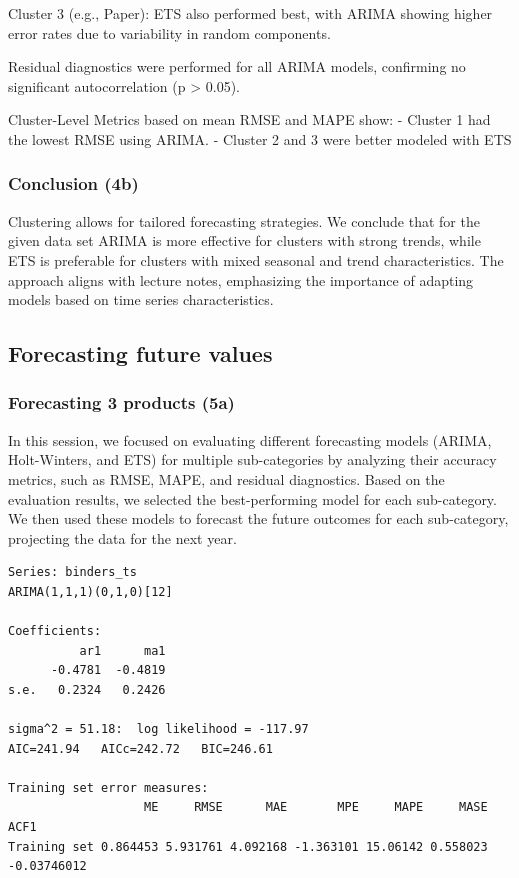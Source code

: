 \documentclass[
  letterpaper,
  DIV=11,
  numbers=noendperiod]{scrartcl}
\begin{document}
Cluster 3 (e.g., Paper): ETS also performed best, with ARIMA showing
higher error rates due to variability in random components.

Residual diagnostics were performed for all ARIMA models, confirming no
significant autocorrelation (p \textgreater{} 0.05).

Cluster-Level Metrics based on mean RMSE and MAPE show: - Cluster 1 had
the lowest RMSE using ARIMA. - Cluster 2 and 3 were better modeled with
ETS

\subsubsection{Conclusion (4b)}\label{conclusion-4b}

Clustering allows for tailored forecasting strategies. We conclude that
for the given data set ARIMA is more effective for clusters with strong
trends, while ETS is preferable for clusters with mixed seasonal and
trend characteristics. The approach aligns with lecture notes,
emphasizing the importance of adapting models based on time series
characteristics.

\subsection{Forecasting future values}\label{forecasting-future-values}

\subsubsection{Forecasting 3 products
(5a)}\label{forecasting-3-products-5a}

In this session, we focused on evaluating different forecasting models
(ARIMA, Holt-Winters, and ETS) for multiple sub-categories by analyzing
their accuracy metrics, such as RMSE, MAPE, and residual diagnostics.
Based on the evaluation results, we selected the best-performing model
for each sub-category. We then used these models to forecast the future
outcomes for each sub-category, projecting the data for the next year.

\begin{verbatim}
Series: binders_ts 
ARIMA(1,1,1)(0,1,0)[12] 

Coefficients:
          ar1      ma1
      -0.4781  -0.4819
s.e.   0.2324   0.2426

sigma^2 = 51.18:  log likelihood = -117.97
AIC=241.94   AICc=242.72   BIC=246.61

Training set error measures:
                   ME     RMSE      MAE       MPE     MAPE     MASE        ACF1
Training set 0.864453 5.931761 4.092168 -1.363101 15.06142 0.558023 -0.03746012
\end{verbatim}
\end{document}
